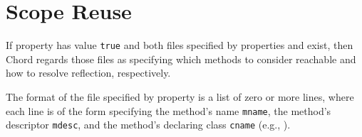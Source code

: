 %
%

\section{Scope Reuse}
\label{sec:scope-reuse}

If property  has value {\tt true} and both
files specified by properties  and
 exist, then Chord regards those files as
specifying which methods to consider reachable and how to resolve
reflection, respectively.

The format of the file specified by property 
is a list of zero or more lines, where each line is of the form
specifying the method's name {\tt mname}, the method's descriptor
{\tt mdesc}, and the method's declaring class {\tt cname} (e.g.,
\code{main:([Ljava/lang/String;)V@foo.bar.Main}).

